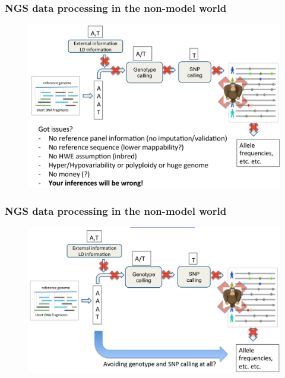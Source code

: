 \begin{frame}
\frametitle{NGS data processing in the \textbf{non-model} world}

	\begin{figure}
        	\includegraphics[width=\textwidth]{Pics/ngs_3.png}
	\end{figure}

\end{frame}

\begin{frame}
\frametitle{NGS data processing in the \textbf{non-model} world}

	\begin{figure}
        	\includegraphics[width=\textwidth]{Pics/ngs_4.png}
	\end{figure}

\end{frame}



